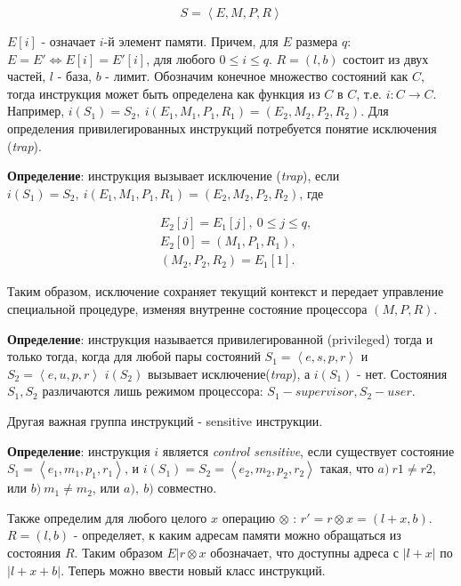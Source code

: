 \begin{equation}\label{eq:machine_state}
    S=\left<E, M, P, R\right>
\end{equation}

$E[i]$ - означает $i$-й элемент памяти. Причем, для $E$ размера $q$: $E=E' \Leftrightarrow E[i] = E'[i]$, для любого $0 \le i  \le q$. $R=(l, b)$ состоит из двух частей, $l$ - база, $b$ - лимит. Обозначим конечное множество состояний как $C$, тогда инструкция может быть определена как функция из $C$ в $C$, т.е.  $i:C\to C$. Например, $i(S_1) = S_2,\ i(E_1, M_1, P_1, R_1) = (E_2, M_2, P_2, R_2)$. Для определения привилегированных инструкций потребуется понятие исключения (\textit{trap}).

\textbf{Определение}: инструкция вызывает исключение (\textit{trap}), если $i(S_1) = S_2,\ i(E_1, M_1, P_1, R_1) = (E_2, M_2, P_2, R_2)$, где

\begin{equation*}
    \begin{aligned}
        &E_2[j] = E_1[j],\ 0 \le j \le q,\\
        &E_2[0] = (M_1, P_1, R_1),\\
        &(M_2, P_2, R_2) = E_1[1].
    \end{aligned}
\end{equation*}

Таким образом, исключение сохраняет текущий контекст и передает управление специальной процедуре, изменяя внутренне состояние процессора $(M, P, R)$.

\textbf{Определение}: инструкция называется привилегированной (privileged) тогда и только тогда, когда для любой пары состояний $S_1=\left<e, s, p, r\right>$ и $S_2=\left<e, u, p, r\right>$ $i(S_2)$ вызывает исключение(\textit{trap}), а $i(S_1)$ - нет. Состояния $S_1, S_2$ различаются лишь режимом процессора: $S_1 - supervisor, S_2 - user$.

Другая важная группа инструкций - sensitive инструкции.

\textbf{Определение}: инструкция $i$ является \textit{control sensitive}, если существует состояние $S_1=\left<e_1, m_1, p_1, r_1\right>$, и $i(S_1) = S_2 = \left<e_2, m_2, p_2, r_2\right>$ такая, что $a)\ r1 \ne r2$, или $b)\ m_1 \ne m_2$, или $a),\ b)$ совместно.

Также определим для любого целого $x$ операцию $\otimes$ : $r' = r \otimes x = (l+x, b)$. $R=(l, b)$ - определяет, к каким адресам памяти можно обращаться из состояния $R$. Таким образом $E|r \otimes x$ обозначает, что доступны адреса с $|l + x|$ по $|l + x + b|$. Теперь можно ввести новый класс инструкций.

